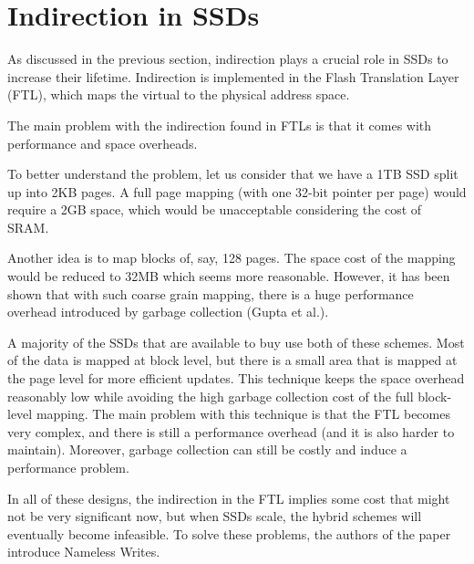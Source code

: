 \documentclass[twocolumn,a4paper,10pt]{article}
\begin{document}
\section*{Indirection in SSDs}
As discussed in the previous section, indirection plays a crucial role in
SSDs to increase their lifetime. Indirection is implemented in the Flash
Translation Layer (FTL), which maps the virtual to the physical address space. 

The main problem with the indirection found in FTLs is that it comes with
performance and space overheads.

To better understand the problem, let us consider that we have a 1TB SSD split
up into 2KB pages. A full page mapping (with one 32-bit pointer per page)
would require a 2GB space, which would be unacceptable considering the cost
of SRAM.

Another idea is to map blocks of, say, 128 pages. The space cost of the
mapping would be reduced to 32MB which seems more reasonable. However, it has
been shown that with such coarse grain mapping, there is a huge performance
overhead introduced by garbage collection (Gupta et al.).

A majority of the SSDs that are available to buy use both of these schemes.
Most of the data is mapped at block level, but there is a small area that is
mapped at the page level for more efficient updates. This technique keeps
the space overhead reasonably low while avoiding the high garbage collection
cost of the full block-level mapping. The main problem with this technique is
that the FTL becomes very complex, and there is still a performance overhead
(and it is also harder to maintain). Moreover, garbage collection can still be
costly and induce a performance problem.

In all of these designs, the indirection in the FTL implies some cost that
might not be very significant now, but when SSDs scale, the hybrid schemes
will eventually become infeasible. To solve these problems, the authors of the
paper introduce Nameless Writes.
\end{document}
